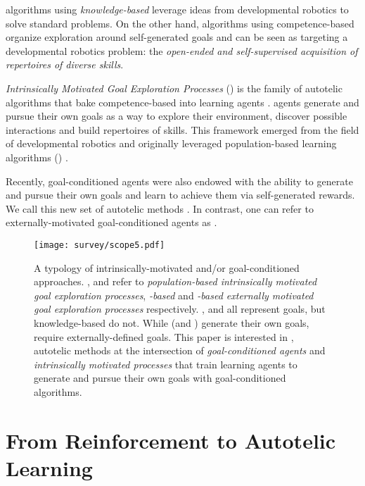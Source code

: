 \rl algorithms using \textit{knowledge-based} \ims leverage ideas from developmental robotics to solve standard \rl problems. On the other hand, \rl algorithms using competence-based \ims organize exploration around self-generated goals and can be seen as targeting a developmental robotics problem: the \textit{open-ended and self-supervised acquisition of repertoires of diverse skills}. 
 
\textit{Intrinsically Motivated Goal Exploration Processes} (\imgep) is the family of autotelic algorithms that bake competence-based \ims into learning agents \cite{imgep}. \imgep agents generate and pursue their own goals as a way to explore their environment, discover possible interactions and build repertoires of skills. This framework emerged from the field of developmental robotics \cite{oudeyer2007intrinsic,baranes2009proximo,baranes2010intrinsically,rolf2010goal} and originally leveraged population-based learning algorithms (\popimgep) \cite{baranes2009r,baranes2013active,forestier2016modular,imgep}. 

Recently, goal-conditioned \rl agents were also endowed with the ability to generate and pursue their own goals and learn to achieve them via self-generated rewards. We call this new set of autotelic methods \rlimgeps. In contrast, one can refer to externally-motivated goal-conditioned \rl agents as \rlemgeps.


\begin{figure}[h]
    \centering
    \texttt{[image: survey/scope5.pdf]}
    \caption{A typology of intrinsically-motivated and/or goal-conditioned \rl approaches. \popimgep, \rlimgep
    and \rlemgep refer to \textit{population-based intrinsically motivated goal exploration processes}, 
        \textit{\textsl{\rl}-based} \textsl{\imgep} and \textit{\textsl{\rl}-based externally motivated goal exploration
        processes} respectively. \popimgep, \rlimgep and \rlemgep all represent goals, but knowledge-based \ims
        do not. While \imgeps (\popimgep and \rlimgep) generate their own goals, \rlemgeps require
        externally-defined goals. This paper is interested in \rlimgeps, autotelic methods at the intersection of
        \textit{goal-conditioned \rl agents} and \textit{intrinsically motivated processes} that train learning
        agents to generate and pursue their own goals with goal-conditioned \rl algorithms. }
    \label{fig:scope}
\end{figure}


\section{From Reinforcement to Autotelic Learning}


